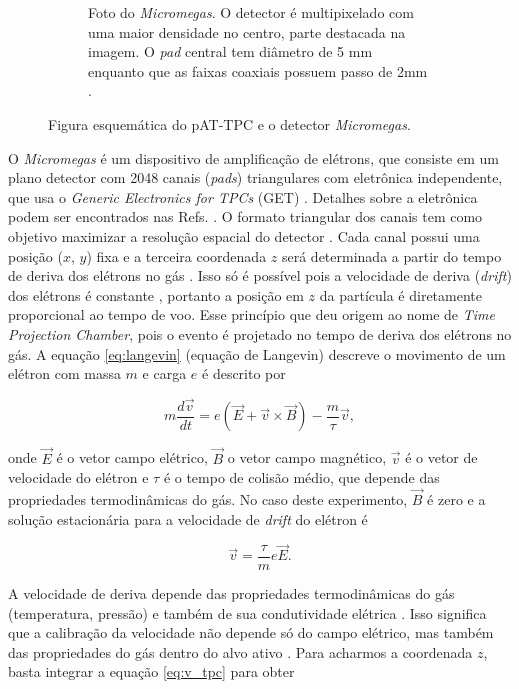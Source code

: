 \documentclass[a4paper,12pt,oneside]{book}
\begin{document}
\begin{figure}[H]
\begin{subfigure}[t]{0.49\textwidth}
        \caption{Foto do \textit{Micromegas}. O detector é multipixelado com uma maior densidade no centro, parte destacada na imagem. O \textit{pad} central tem diâmetro de 5 mm enquanto que as faixas coaxiais possuem passo de 2mm \cite{attpc, josh_bradt}.}
        \label{subfig:micromegas} 
    \end{subfigure}
\caption{Figura esquemática do pAT-TPC e o detector \textit{Micromegas}\cite{pattpc}.}
\label{fig:pattpc_e_micromegas}
\end{figure}

\par O \textit{Micromegas} é um dispositivo de amplificação de elétrons, que consiste em um plano detector com 2048 canais (\textit{pads}) triangulares com eletrônica independente, que usa o \textit{Generic Electronics for TPCs} (GET) \cite{GET}. Detalhes sobre a eletrônica podem ser encontrados nas Refs. \cite{GET, josh_bradt}. O formato triangular dos canais tem como objetivo maximizar a resolução espacial do detector \cite{attpc}. Cada canal possui uma posição ($x$, $y$) fixa e a terceira coordenada $z$ será determinada a partir do tempo de deriva dos elétrons no gás \cite{pattpc, pattpc2, attpc, josh_bradt}. Isso só é possível pois a velocidade de deriva (\textit{drift}) dos elétrons é constante \cite{drift_constant}, portanto a posição em $z$ da partícula é diretamente proporcional ao tempo de voo. Esse princípio que deu origem ao nome de \textit{Time Projection Chamber}, pois o evento é projetado no tempo de deriva dos elétrons no gás. A equação  \ref{eq:langevin} (equação de Langevin) descreve o movimento de um elétron com massa $m$ e carga $e$ é descrito por \cite{drift_constant}

\begin{equation}\label{eq:langevin}
    m\frac{d\vec{v}}{dt} = e\left(\vec{E} +\vec{v}\times \vec{B}\right) - \frac{m}{\tau}\vec{v},
\end{equation}

onde $\vec{E}$ é o vetor campo elétrico, $\vec{B}$ o vetor campo magnético, $\vec{v}$ é o vetor de velocidade do elétron e $\tau$ é o tempo de colisão médio, que depende das propriedades termodinâmicas do gás. No caso deste experimento, $\vec{B}$ é zero e a solução estacionária para a velocidade de \textit{drift} do elétron é

\begin{equation}\label{eq:v_tpc}
    \vec{v} = \frac{\tau}{m}e\vec{E}.
\end{equation}

\par A velocidade de deriva depende das propriedades termodinâmicas do gás (temperatura, pressão) e também de sua condutividade elétrica \cite{drift_constant}. Isso significa que a calibração da velocidade não depende só do campo elétrico, mas também das propriedades do gás dentro do alvo ativo \cite{pattpc, drift_constant}. Para acharmos a coordenada $z$, basta integrar a equação \ref{eq:v_tpc} para obter
\end{document}

